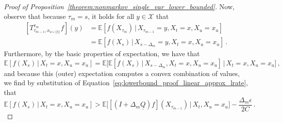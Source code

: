 \documentclass[10pt,a4paper]{paper}
\theoremstyle{definition}
\newcommand{\states}{\mathcal{X}}
\newcommand{\lrate}{\underline{Q}}
\begin{document}
\begin{proof}[Proof of Proposition~\ref{theorem:nonmarkov_single_var_lower_bounded}]
Now, observe that because $\tau_m=s$, it holds for all $y\in\states$ that
\begin{align*}
\left[T_{\tau_{m-1},x_{u\cup\{t\}}}^{\tau_{m}}f\right](y) &= \mathbb{E}[f(X_{\tau_m})\,\vert\,X_{\tau_{m-1}}=y,X_t=x,X_u=x_u]\\
 &= \mathbb{E}[f(X_{s})\,\vert\,X_{s-\Delta_m}=y,X_t=x,X_u=x_u]\,.
\end{align*}
Furthermore, by the basic properties of expectation, we have that
\begin{equation*}
\mathbb{E}[f(X_s)\,\vert\,X_t=x,X_u=x_u] = \mathbb{E}\bigl[\mathbb{E}[f(X_s)\,\vert\,X_{s-\Delta_m},X_t=x,X_u=x_u]\,\vert\,X_t=x,X_u=x_u\bigr]\,,
\end{equation*}
and because this (outer) expectation computes a convex combination of values, we find by substitution of Equation~\eqref{eq:lowerbound_proof_linear_approx_lrate}, that
\begin{equation*}
\mathbb{E}[f(X_s)\,\vert\,X_t=x,X_u=x_u] > \mathbb{E}\bigl[[(I+\Delta_m\lrate)f](X_{\tau_{m-1}})\,\vert\,X_t,X_u=x_u\bigr] - \frac{\Delta_{m}\epsilon}{2C}\,.
\end{equation*}


\end{proof}
\end{document}
